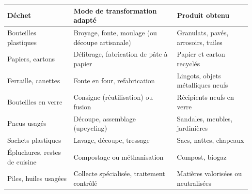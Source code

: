 \documentclass[11pt]{article}
\begin{document}
\begin{center}
\begin{tabularx}{\linewidth}{|l|X|X|}
\hline
\rowcolor{popblueL} \textbf{Déchet} & \textbf{Mode de transformation adapté} & \textbf{Produit obtenu} \\
\hline
Bouteilles plastiques & Broyage, fonte, moulage (ou découpe artisanale) & Granulats, pavés, arrosoirs, tuiles \\
\hline
Papiers, cartons & Défibrage, fabrication de pâte à papier & Papier et carton recyclés \\
\hline
Ferraille, canettes & Fonte en four, refabrication & Lingots, objets métalliques neufs \\
\hline
Bouteilles en verre & Consigne (réutilisation) ou fusion & Récipients neufs en verre \\
\hline
Pneus usagés & Découpe, assemblage (upcycling) & Sandales, meubles, jardinières \\
\hline
Sachets plastiques & Lavage, découpe, tressage & Sacs, nattes, chapeaux \\
\hline
Épluchures, restes de cuisine & Compostage ou méthanisation & Compost, biogaz \\
\hline
Piles, huiles usagées & Collecte spécialisée, traitement contrôlé & Matières valorisées ou neutralisées \\
\hline
\end{tabularx}
\end{center}
\end{document}
